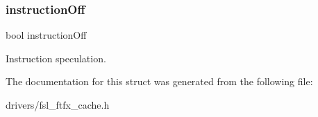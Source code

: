 \subsubsection{\texorpdfstring{instructionOff}{instructionOff}}
{\footnotesize\ttfamily bool instruction\+Off}

Instruction speculation. 

The documentation for this struct was generated from the following file\+:\begin{DoxyCompactItemize}
\item 
drivers/fsl\+\_\+ftfx\+\_\+cache.\+h\end{DoxyCompactItemize}
